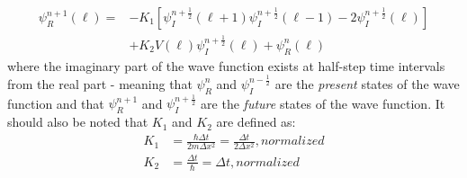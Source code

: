 \documentclass[twocolumn]{article}
\begin{document}
\begin{equation}
\begin{split}
  \psi_R^{n+1}(\ell) = &-K_1[\psi_I^{n+\frac{1}{2}}(\ell+1)\psi_I^{n+\frac{1}{2}}(\ell-1)-2\psi_I^{n+\frac{1}{2}}(\ell)]\\ 
  &+K_2V(\ell)\psi_I^{n+\frac{1}{2}}(\ell)+\psi_R^{n}(\ell)
\end{split}
\end{equation}
where the imaginary part of the wave function exists at half-step time intervals from the real part - meaning that $\psi_R^n$ and $\psi_I^{n-\frac{1}{2}}$ are the \textit{present} states of the wave function and that $\psi_R^{n+1}$ and $\psi_I^{n+\frac{1}{2}}$ are the \textit{future} states of the wave function. It should also be noted that $K_1$ and $K_2$ are defined as:
\begin{align}
	K_1 &= \frac{\hbar \Delta t}{2m\Delta x^2} = \frac{\Delta t}{2\Delta x^2}, normalized \\
	K_2 &= \frac{\Delta t}{\hbar} = \Delta t, normalized
\end{align}
\end{document}
